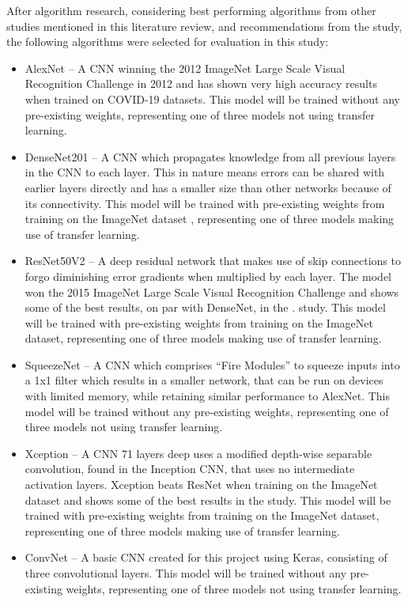 After algorithm research, considering best performing algorithms from other studies mentioned in this literature review, and recommendations from the \cite{roberts2021common} study, the following algorithms were selected for evaluation in this study:
\begin{itemize}
    \item AlexNet \citep{krizhevsky2012imagenet} – A CNN winning the 2012 ImageNet Large Scale Visual Recognition Challenge in 2012 and has shown very high accuracy results when trained on COVID-19 datasets. This model will be trained without any pre-existing weights, representing one of three models not using transfer learning.
    
    \item DenseNet201 \citep{huang2017densely} – A CNN which propagates knowledge from all previous layers in the CNN to each layer. This in nature means errors can be shared with earlier layers directly and has a smaller size than other networks because of its connectivity. This model will be trained with pre-existing weights from training on the ImageNet dataset \citep{deng2009imagenet}, representing one of three models making use of transfer learning.
    
    \item ResNet50V2 \citep{he2016identity} – A deep residual network that makes use of skip connections to forgo diminishing error gradients when multiplied by each layer. The model won the 2015 ImageNet Large Scale Visual Recognition Challenge and shows some of the best results, on par with DenseNet, in the \cite{bressem2020comparing}. study. This model will be trained with pre-existing weights from training on the ImageNet dataset, representing one of three models making use of transfer learning.
    
    \item SqueezeNet \citep{iandola2016squeezenet} – A CNN which comprises “Fire Modules” to squeeze inputs into a 1x1 filter which results in a smaller network, that can be run on devices with limited memory, while retaining similar performance to AlexNet. This model will be trained without any pre-existing weights, representing one of three models not using transfer learning.
    
    \item Xception \citep{chollet2017xception} – A CNN 71 layers deep uses a modified depth-wise separable convolution, found in the Inception CNN, that uses no intermediate activation layers. Xception beats ResNet when training on the ImageNet dataset and shows some of the best results in the \citep{bressem2020comparing} study. This model will be trained with pre-existing weights from training on the ImageNet dataset, representing one of three models making use of transfer learning.
    
    \item ConvNet – A basic CNN created for this project using Keras, consisting of three convolutional layers. This model will be trained without any pre-existing weights, representing one of three models not using transfer learning.
\end{itemize}